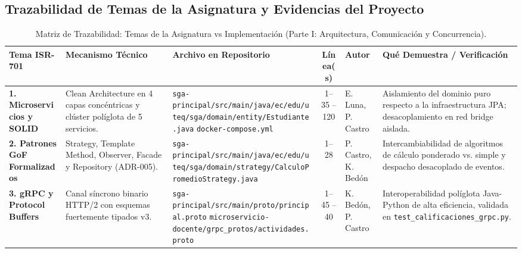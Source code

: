\documentclass[11pt,a4paper]{article}
\begin{document}
\subsection{Trazabilidad de Temas de la Asignatura y Evidencias del Proyecto}
\clearpage
\begin{table}[H]
\centering
\caption{Matriz de Trazabilidad: Temas de la Asignatura vs Implementaci\'on (Parte I: Arquitectura, Comunicaci\'on y Concurrencia).}
\label{tab:trazabilidad-temas-p1}
\scriptsize
\setlength{\tabcolsep}{3pt}
\renewcommand{\arraystretch}{1.02}
\begin{tabularx}{\textwidth}{|p{2.2cm}|p{2.5cm}|p{4.8cm}|c|p{1.4cm}|X|}
\hline
\textbf{Tema ISR-701} & \textbf{Mecanismo T\'ecnico} & \textbf{Archivo en Repositorio} & \textbf{L\'inea(s)} & \textbf{Autor} & \textbf{Qu\'e Demuestra / Verificaci\'on} \\
\hline
\textbf{1. Microservicios y SOLID} &
Clean Architecture en 4 capas conc\'entricas y cl\'uster pol\'iglota de 5 servicios. &
\texttt{sga-principal/src/main/java/}\allowbreak\texttt{ec/edu/uteq/sga/domain/}\allowbreak\texttt{entity/Estudiante.java} \newline
\texttt{docker-compose.yml} &
1--35 \newline
1--120 &
E. Luna, \newline P. Castro &
Aislamiento del dominio puro respecto a la infraestructura JPA; desacoplamiento en red bridge aislada. \\
\hline
\textbf{2. Patrones GoF Formalizados} &
Strategy, Template Method, Observer, Facade y Repository (ADR-005). &
\texttt{sga-principal/src/main/java/}\allowbreak\texttt{ec/edu/uteq/sga/domain/}\allowbreak\texttt{strategy/CalculoPromedioStrategy.java} &
1--28 &
P. Castro, \newline K. Bed\'on &
Intercambiabilidad de algoritmos de c\'alculo ponderado vs. simple y despacho desacoplado de eventos. \\
\hline
\textbf{3. gRPC y Protocol Buffers} &
Canal s\'incrono binario HTTP/2 con esquemas fuertemente tipados v3. &
\texttt{sga-principal/src/main/proto/}\allowbreak\texttt{principal.proto} \newline
\texttt{microservicio-docente/grpc\_protos/}\allowbreak\texttt{actividades.proto} &
1--45 \newline
1--40 &
K. Bed\'on, \newline P. Castro &
Interoperabilidad pol\'iglota Java-Python de alta eficiencia, validada en \texttt{test\_calificaciones\_grpc.py}. \\

\end{tabularx}
\end{table}
\end{document}
